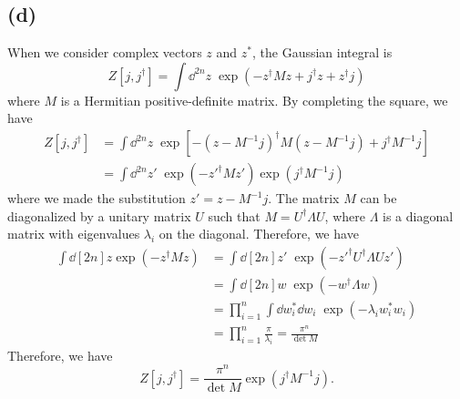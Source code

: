 \documentclass{article}
\begin{document}
\subsection*{(d)}
When we consider complex vectors $z$ and $z^*$, the Gaussian integral is 
\begin{equation}
    Z[j,j^\dagger]= \int \dd^{2n} z  \; \exp\left(-z^\dagger M z + j^\dagger z + z^\dagger j\right) 
\end{equation}
where $M$ is a Hermitian positive-definite matrix.
By completing the square, we have
\begin{equation}
    \begin{split}
        Z[j,j^\dagger] & = \int \dd^{2n} z \; \exp\left[-(z - M^{-1} j)^\dagger M (z - M^{-1} j) + j^\dagger M^{-1} j\right] \\
                       & = \int \dd^{2n} z' \; \exp\left(-z'^\dagger M z'\right) \exp\left(j^\dagger M^{-1} j\right) 
    \end{split}
\end{equation}
where we made the substitution $z' = z - M^{-1} j$.
The matrix $M$ can be diagonalized by a unitary matrix $U$ such that $M = U^\dagger \Lambda U$, where $\Lambda$ is a diagonal matrix with eigenvalues $\lambda_i$ on the diagonal.
Therefore, we have
\begin{equation}
    \begin{split}
        \int\dd[2n]{z}\exp(-z^\dagger M z) & = \int \dd[2n]{z'} \; \exp(-z'^\dagger U^\dagger \Lambda U z')\\
                                                   & = \int \dd[2n]{w} \; \exp(-w^\dagger \Lambda w)\\
                                                   & = \prod_{i=1}^n \int \dd{w_i^*} \dd{w_i} \; \exp(-\lambda_i w_i^* w_i)\\
                                                   & = \prod_{i=1}^n \frac{\pi}{\lambda_i} = \frac{\pi^n}{\det M}
    \end{split}
\end{equation}
Therefore, we have
\begin{equation}
    Z[j,j^\dagger] = \frac{\pi^n}{\det M} \exp\left(j^\dagger M^{-1} j\right).
\end{equation}
\end{document}
